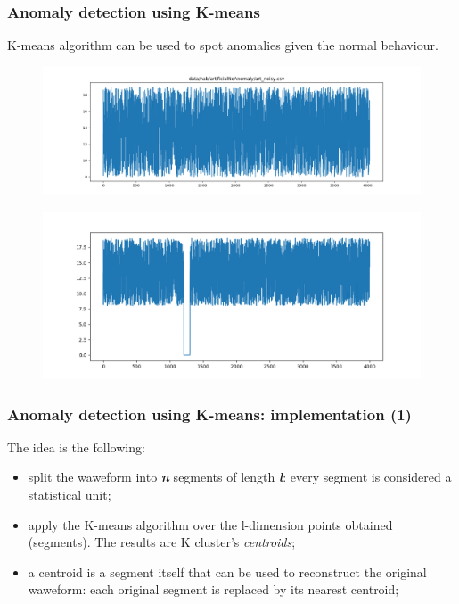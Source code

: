 \documentclass[xcolor ={table,usenames,dvipsnames}]{beamer}
\theoremstyle{definition}
\begin{document}
	\begin{frame}[fragile]
		\frametitle{Anomaly detection using K-means}
		K-means algorithm can be used to spot anomalies given the normal behaviour.
			\begin{figure}[]
			\centering
			\includegraphics[scale=0.15]{img/normalbe.png}
		\end{figure}
		
		\begin{figure}[]
			\centering
			\includegraphics[scale=0.20]{img/anomaly.png}
		\end{figure}
	
	\end{frame}

	\begin{frame}
		\frametitle{Anomaly detection using K-means: implementation (1)}
		The idea is the following:
		\begin{itemize}
			\item split the waweform into \textbf{\textit{n}} segments of length \textbf{\textit{l}}: every segment is considered a statistical unit;
			\item apply the K-means algorithm over the l-dimension points obtained (segments). The results are K cluster's \textit{centroids};
			\item a centroid is a segment itself that can be used to reconstruct the original waweform: each original segment is replaced by its nearest centroid;
		\end{itemize}
	\end{frame}
\end{document}
